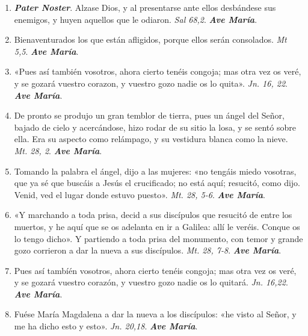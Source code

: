 \documentclass[../../devocionario.tex]{subfiles}
\begin{document}
    \begin{enumerate}
    
        \item \textbf{\textit{Pater Noster}}. Alzase Dios, y al presentarse ante ellos desbándese sus enemigos, 
            y huyen aquellos que le odiaron. \textit{Sal 68,2}. \textbf{\textit{Ave María}}.

        \item Bienaventurados los que están afligidos, porque ellos serán consolados. \textit{Mt 5,5}. \textbf{\textit{Ave María}}.

        \item «Pues así también vosotros, ahora cierto tenéis congoja; mas otra vez os veré, y se gozará vuestro corazon, 
            y vuestro gozo nadie os lo quita». \textit{Jn. 16, 22}. \textbf{\textit{Ave María}}.

        \item De pronto se produjo un gran temblor de tierra, pues un ángel del Señor, bajado de cielo y acercándose, 
            hizo rodar de su sitio la losa, y se sentó sobre ella. Era su aspecto como relámpago, 
            y su vestidura blanca como la nieve. \textit{Mt. 28, 2}. \textbf{\textit{Ave María}}.

        \item Tomando la palabra el ángel, dijo a las mujeres: «no tengáis miedo vosotras, que ya sé que buscáis a Jesús el crucificado; 
            no está aquí; resucitó, como dijo. Venid, ved el lugar donde estuvo puesto». \textit{Mt. 28, 5-6}. \textbf{\textit{Ave María}}.

        \item «Y marchando a toda prisa, decid a sus discípulos que resucitó de entre los muertos, 
            y he aquí que se os adelanta en ir a Galilea: allí le veréis. Conque os lo tengo dicho». 
            Y partiendo a toda prisa del monumento, con temor y grande gozo corrieron a dar la nueva a sus discípulos. \textit{Mt. 28, 7-8}. \textbf{\textit{Ave María}}.

        \item Pues así tambíén vosotros, ahora cierto tenéis congoja; mas otra vez os veré, y se gozará vuestro corazón, 
            y vuestro gozo nadie os lo quitará. \textit{Jn. 16,22}. \textbf{\textit{Ave María}}.

        \item Fuése María Magdalena a dar la nueva a los discípulos: «he visto al Señor, 
            y me ha dicho esto y esto». \textit{Jn. 20,18}. \textbf{\textit{Ave María}}.


\end{enumerate}
\end{document}
